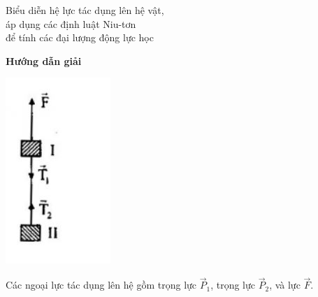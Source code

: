 \begin{dang}{Biểu diễn hệ lực tác dụng lên hệ vật, \\áp dụng các định luật Niu-tơn \\để tính các đại lượng động lực học}

	{	\begin{center}
			\textbf{Hướng dẫn giải}
		\end{center}
		\begin{figure}[h]
			\centering
			\begin{subfigure}{0.5\linewidth}
				
			\end{subfigure}
		\end{figure}
		\begin{center}
			\includegraphics[scale=0.8]{../figs/VN10-PH-12-A-003-1-V2-02.jpg}
		\end{center}
		Các ngoại lực tác dụng lên hệ gồm trọng lực $\vec P_1$, trọng lực $ \vec P_2$, và lực $ \vec F$. 
		
}
\end{dang}
